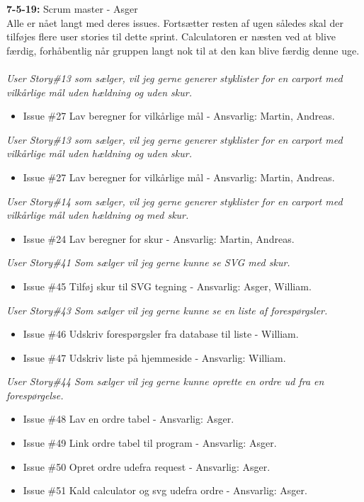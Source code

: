 \documentclass[11pt]{report}
\begin{document}
\noindent\textbf{7-5-19:} Scrum master - Asger\\
Alle er nået langt med deres issues. Fortsætter resten af ugen således skal der tilføjes flere user stories til dette sprint. Calculatoren er næsten ved at blive færdig, forhåbentlig når gruppen langt nok til at den kan blive færdig denne uge.\\\\
\textit{User Story\#13 som sælger, vil jeg gerne generer styklister for en carport med vilkårlige mål uden hældning og uden skur.}
\begin{itemize}
\renewcommand\labelitemi{--}
\item Issue \#27 Lav beregner for vilkårlige mål - Ansvarlig: Martin, Andreas.
\end{itemize}
\textit{User Story\#13 som sælger, vil jeg gerne generer styklister for en carport med vilkårlige mål uden hældning og uden skur.}
\begin{itemize}
\renewcommand\labelitemi{--}
\item Issue \#27 Lav beregner for vilkårlige mål - Ansvarlig: Martin, Andreas.
\end{itemize}
\textit{User Story\#14 som sælger, vil jeg gerne generer styklister for en carport med vilkårlige mål uden hældning og med skur.}
\begin{itemize}
\renewcommand\labelitemi{--}
\item Issue \#24 Lav beregner for skur - Ansvarlig: Martin, Andreas.
\end{itemize}
\textit{User Story\#41 Som sælger vil jeg gerne kunne se SVG med skur.}
\begin{itemize}
\renewcommand\labelitemi{--}
\item Issue \#45 Tilføj skur til SVG tegning - Ansvarlig: Asger, William.
\end{itemize}
\textit{User Story\#43 Som sælger vil jeg gerne kunne se en liste af forespørgsler.}
\begin{itemize}
\renewcommand\labelitemi{--}
\item Issue \#46 Udskriv forespørgsler fra database til liste -
  William.
\item Issue \#47 Udskriv liste på hjemmeside - Ansvarlig: William.
\end{itemize}
\textit{User Story\#44 Som sælger vil jeg gerne kunne oprette en ordre ud fra en forespørgelse.}
\begin{itemize}
\renewcommand\labelitemi{--}
\item Issue \#48  Lav en ordre tabel - Ansvarlig: Asger.
\item Issue \#49 Link ordre tabel til program - Ansvarlig: Asger.
\item Issue \#50 Opret ordre udefra request - Ansvarlig: Asger.
\item Issue \#51 Kald calculator og svg udefra ordre - Ansvarlig: Asger.
\end{itemize}
\end{document}
